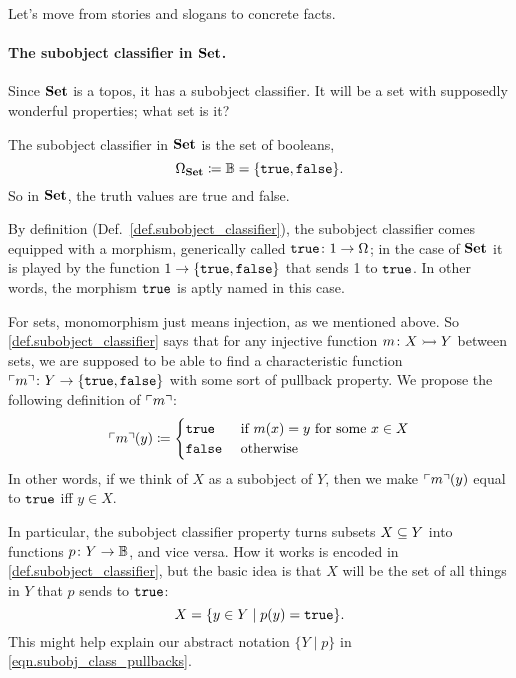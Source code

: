 \documentclass[7Sketches]{subfiles}
\begin{document}
Let's move from stories and slogans to concrete facts.

\paragraph{The subobject classifier in $\smset$.}
%
%
Since $\smset$ is a topos, it has a subobject classifier. It will be a set with supposedly wonderful properties; what set is it?

The subobject classifier in $\smset$ is the set of booleans,
\begin{equation}%
\label{eqn.Omega_Set}
	\Omega_\smset\coloneqq\BB=\{\true,\false\}.
\end{equation}
So in $\smset$, the truth values are true and false.

By definition (Def.~\ref{def.subobject_classifier}), the subobject classifier comes equipped with a morphism, generically called $\true\colon1\to\Omega$; in the case of $\smset$ it is played by the function $1\to\{\true,\false\}$ that sends 1 to $\true$. In other words, the morphism $\true$ is aptly named in this case.

For sets, monomorphism just means injection, as we mentioned above. So
\cref{def.subobject_classifier} says that for any injective function $m\colon
X\inj Y$ between sets, we are supposed to be able to find a characteristic
function $\corners{m}\colon Y\to\{\true,\false\}$ with some sort of pullback
property. We propose the following definition of $\corners{m}$:
\[
\corners{m}(y)\coloneqq
\begin{cases}
	\true&\tn{ if }m(x)=y\text{ for some $x\in X$}\\
	\false&\tn{ otherwise}
\end{cases}
\]
In other words, if we think of $X$ as a subobject of $Y$, then we make $\corners{m}(y)$ equal to $\true$ iff $y\in X$.

In particular, the subobject classifier property turns subsets $X\ss Y$ into functions $p\colon Y \to \BB$, and vice versa. How it works is encoded in \cref{def.subobject_classifier}, but the basic idea is that $X$ will be the set of all things in $Y$ that $p$ sends to $\true$:
\begin{equation}%
\label{eqn.pullback_concrete_sets}
	X=\{y\in Y\mid p(y)=\true\}.
\end{equation}
This might help explain our abstract notation $\{Y\mid p\}$ in \cref{eqn.subobj_class_pullbacks}.%
\end{document}
